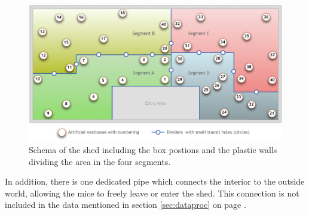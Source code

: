 \begin{figure}[htpb]
\begin{center}
  \includegraphics[width=\textwidth]{assets/pdf/shed_schema.pdf}
  \caption[Schema of the shed]{Schema of the shed including the box postions and the plastic walls dividing the area in the four segments. }
  \label{fig:shedschema}
\end{center}
\end{figure}

In addition, there is one dedicated pipe which connects the interior to the outside world, allowing the mice to freely leave or enter the shed. This connection is not included in the data mentioned in section \ref{sec:dataproc} on page \pageref{sec:dataproc}.